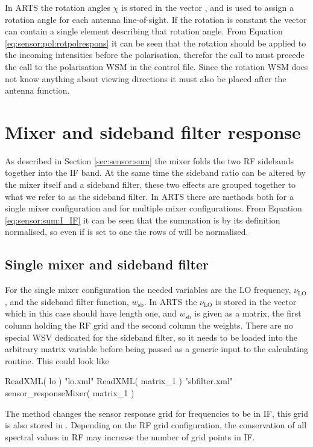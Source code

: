 In ARTS the rotation angles $\chi$ is stored in the vector
, and is used to assign a rotation angle for
each antenna line-of-sight. If the rotation is constant the
 vector can contain a single element describing
that rotation angle. From Equation \ref{eq:sensor:pol:rotpolrespons}
it can be seen that the rotation should be applied to the incoming
intensities before the polarisation, therefor the call to
 must precede the call to the
polarisation WSM in the control file. Since the rotation WSM does not
know anything about viewing directions it must also be placed after
the antenna function.


\section{Mixer and sideband filter response}
As described in Section \ref{sec:sensor:sum} the mixer folds the two
RF sidebands together into the IF band. At the same time the sideband
ratio can be altered by the mixer itself and a sideband filter, these
two effects are grouped together to what we refer to as the sideband
filter. In ARTS there are methods both for a single mixer
configuration and for multiple mixer configurations. From
Equation \ref{eq:sensor:sum:I_IF} it can be seen that the summation is
by its definition normalised, so even if  is
set to one the rows of  will be normalised.

\subsection{Single mixer and sideband filter}
For the single mixer configuration the needed variables are the LO
frequency, $\nu_\mathrm{LO}$, and the sideband filter function,
$w_\mathrm{sb}$. In ARTS the $\nu_\mathrm{LO}$ is stored in the vector
 which in this case should have length one, and
$w_\mathrm{sb}$ is given as a matrix, the first column holding the RF
grid and the second column the weights. There are no special WSV
dedicated for the sideband filter, so it needs to be loaded into the
arbitrary matrix variable  before being passed as
a generic input to the calculating routine. This could look like
\begin{code}
ReadXML( lo ) { "lo.xml" }
ReadXML( matrix_1 ) { "sbfilter.xml" }
sensor_responseMixer( matrix_1 ) {}
\end{code}
The method  changes the sensor
response grid for frequencies to be in IF, this grid is also stored in
. Depending on the RF grid configuration, the
conservation of all spectral values in RF may increase the number of
grid points in IF.

